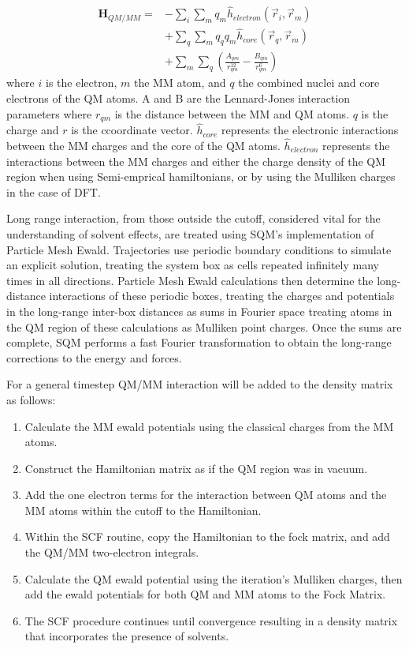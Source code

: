    \begin{align}
     \mathbf{H}_{QM/MM} = &- \sum_i \sum_m q_m \hat{h}_{electron} (\vec{r}_i,  \vec{r}_m)\\
			  &+ \sum_q \sum_m q_q q_m \hat{h}_{core} (\vec{r}_q, \vec{r}_m)\\
			  &+ \sum_m \sum_q \left( \frac{A_{qm}}{r_{qm}^{12}} - \frac{B_{qm}}{r_{qm}^6} \right)
   \end{align}
   where \(i\) is the electron, \(m\) the MM atom, and \(q\) the combined nuclei and core electrons of the QM atoms.
   A and B are the Lennard-Jones interaction parameters where \(r_{qm}\) is the distance between the MM and QM atoms.
   \(q\) is the charge and \(r\) is the ccoordinate vector.
   \(\hat{h}_{core}\) represents the electronic interactions between the MM charges and the core of the QM atoms.
   \(\hat{h}_{electron}\) represents the interactions between the MM charges and either the charge density of the QM region when using Semi-emprical hamiltonians, or by using the Mulliken charges in the case of DFT.

   Long range interaction, from those outside the cutoff, considered vital for the understanding of solvent effects, are treated using SQM’s implementation of Particle Mesh Ewald.
   Trajectories use periodic boundary conditions to simulate an explicit solution, treating the system box as cells repeated infinitely many times in all directions.
   Particle Mesh Ewald calculations then determine the long-distance interactions of these periodic boxes, treating the charges and potentials in the long-range inter-box distances as sums in Fourier space treating atoms in the QM region of these calculations as Mulliken point charges.\cite{essman1995smooth}
   Once the sums are complete, SQM performs a fast Fourier transformation to obtain the long-range corrections to the energy and forces. 


   For a general timestep QM/MM interaction will be added to the density matrix as follows: 
\begin{enumerate}
   \item Calculate the MM ewald potentials using the classical charges from the MM atoms.
   \item Construct the Hamiltonian matrix as if the QM region was in vacuum.
   \item Add the one electron terms for the interaction between QM atoms and the MM atoms within the cutoff to the Hamiltonian.
   \item Within the SCF routine, copy the Hamiltonian to the fock matrix, and add the QM/MM two-electron integrals.
   \item Calculate the QM ewald potential using the iteration’s Mulliken charges, then add the ewald potentials for both QM and MM atoms to the Fock Matrix.
   \item The SCF procedure continues until convergence resulting in a density matrix that incorporates the presence of solvents. 
\end{enumerate}

